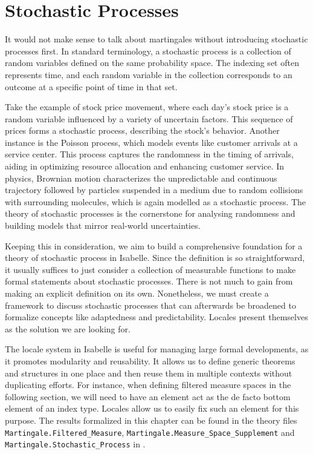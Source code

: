 ﻿%

\chapter{Stochastic Processes}\label{chapter:stochastic_processes}

It would not make sense to talk about martingales without introducing stochastic processes first. In standard terminology, a stochastic process is a collection of random variables defined on the same probability space. The indexing set often represents time, and each random variable in the collection corresponds to an outcome at a specific point of time in that set.

Take the example of stock price movement, where each day's stock price is a random variable influenced by a variety of uncertain factors. This sequence of prices forms a stochastic process, describing the stock's behavior. Another instance is the Poisson process, which models events like customer arrivals at a service center. This process captures the randomness in the timing of arrivals, aiding in optimizing resource allocation and enhancing customer service. In physics, Brownian motion characterizes the unpredictable and continuous trajectory followed by particles suspended in a medium due to random collisions with surrounding molecules, which is again modelled as a stochastic process. The theory of stochastic processes is the cornerstone for analysing randomness and building models that mirror real-world uncertainties.

Keeping this in consideration, we aim to build a comprehensive foundation for a theory of stochastic process in Isabelle. Since the definition is so straightforward, it usually suffices to just consider a collection of measurable functions to make formal statements about stochastic processes. There is not much to gain from making an explicit definition on its own. Nonetheless, we must create a framework to discuss stochastic processes that can afterwards be broadened to formalize concepts like adaptedness and predictability. Locales present themselves as the solution we are looking for.

The locale system in Isabelle is useful for managing large formal developments, as it promotes modularity and reusability. It allows us to define generic theorems and structures in one place and then reuse them in multiple contexts without duplicating efforts. For instance, when defining filtered measure spaces in the following section, we will need to have an element act as the de facto bottom element of an index type. Locales allow us to easily fix such an element for this purpose. The results formalized in this chapter can be found in the theory files \texttt{Martingale.Filtered\_Measure}, \texttt{Martingale.Measure\_Space\_Supplement} and \texttt{Martingale.Stochastic\_Process} in \cite{Keskin_A_Formalization_of_2023}.
\vspace{2em}\\

